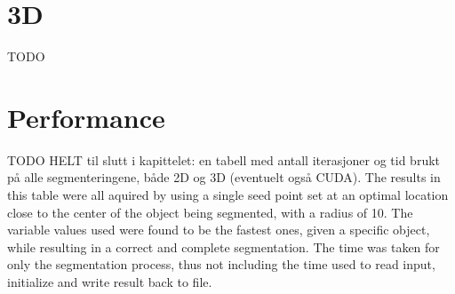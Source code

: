 \section{3D}
TODO

\section{Performance}
TODO 
HELT til slutt i kapittelet: en tabell med antall iterasjoner og tid brukt på alle segmenteringene, både 2D og 3D (eventuelt også CUDA). The results in this table were all aquired by using a single seed point set at an optimal location close to the center of the object being segmented, with a radius of 10. The variable values used were found to be the fastest ones, given a specific object, while resulting in a correct and complete segmentation. The time was taken for only the segmentation process, thus not including the time used to read input, initialize and write result back to file.